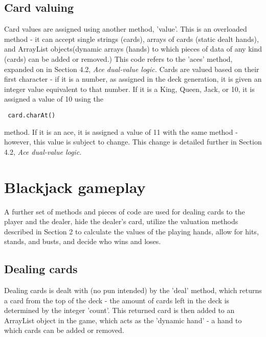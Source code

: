 \documentclass[english]{article}
\begin{document}
\subsection {Card valuing}

Card values are assigned using another method, 'value'. This is an overloaded method - it can accept single strings (cards), arrays of cards (static dealt hands), and ArrayList objects(dynamic arrays (hands) to which pieces of data of any kind (cards) can be added or removed.) This code refers to the 'aces' method, expanded on in Section 4.2, \textit{Ace dual-value logic.} Cards are valued based on their first character - if it is a number, as assigned in the deck generation, it is given an integer value equivalent to that number. If it is a King, Queen, Jack, or 10, it is assigned a value of 10 using the \begin{verbatim} card.charAt() \end{verbatim} method. If it is an ace, it is assigned a value of 11 with the same method - however, this value is subject to change. This change is detailed further in Section 4.2, \textit{Ace dual-value logic.}

\section{Blackjack gameplay}
A further set of methods and pieces of code are used for dealing cards to the player and the dealer, hide the dealer's card, utilize the valuation methods described in Section 2 to calculate the values of the playing hands, allow for hits, stands, and busts, and decide who wins and loses.

\subsection{Dealing cards}

Dealing cards is dealt with (no pun intended) by the 'deal' method, which returns a card from the top of the deck - the amount of cards left in the deck is determined by the integer 'count'. This returned card is then added to an ArrayList object in the game, which acts as the 'dynamic hand' - a hand to which cards can be added or removed.
\end{document}
